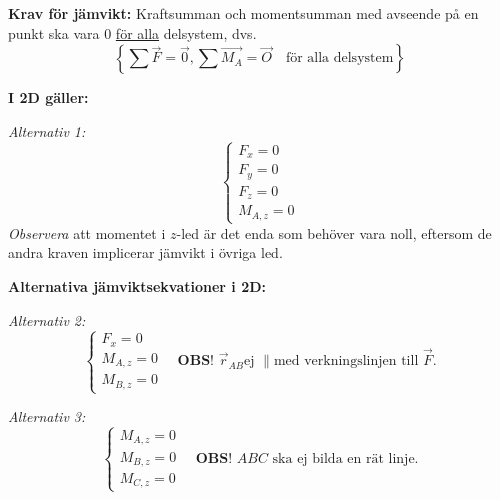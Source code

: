 \documentclass{article}
\newenvironment{ankiflashcard}[1]{}{}
\begin{document}
\begin{paracol}{2}
\begin{ankiflashcard}{Formulera kraven för jämvikt (statik).}
    
\textbf{Krav för jämvikt:} Kraftsumman och momentsumman med avseende på en punkt ska vara $0$ \underline{för alla} delsystem, dvs.
$$
\left\lbrace \sum \vec F = \vec 0, \sum \vec {M_A} = \vec O \quad \text{för alla delsystem}\right\rbrace
$$
\end{ankiflashcard}

\textbf{I 2D gäller:}

\begin{ankiflashcard}{Ställ upp den generella jämviktsekvationen i 2D.}
    
\textit{Alternativ 1:}
$$
\begin{cases}
    F_x = 0\\
    F_y = 0\\
    F_z = 0\\
    M_{A,z} = 0
\end{cases}
$$
\textit{Observera} att momentet i $z$-led är det enda som behöver vara noll, eftersom de andra kraven implicerar jämvikt i övriga led.
\end{ankiflashcard}

\begin{ankiflashcard}{Formulera de alternativa jämviktsekvationerna i 2D.}
    
\textbf{Alternativa jämviktsekvationer i 2D:}

\textit{Alternativ 2:}
$$
\begin{cases}
F_x = 0 \\
M_{A,z} = 0 \\
M_{B,z} = 0
\end{cases} \quad \textbf{OBS! } \vec r_{AB} \text{ej } \parallel \text{med verkningslinjen till } \vec F.
$$

\textit{Alternativ 3:}
$$
\begin{cases}
    M_{A,z} = 0\\
    M_{B,z} = 0 \\
    M_{C,z} = 0
\end{cases} \quad\textbf{OBS! } ABC \text{ ska ej bilda en rät linje.}
$$

\end{ankiflashcard}

\begin{ankiflashcard}{Vad är ett statiskt obestämt problem?}
    

\end{ankiflashcard}
\end{paracol}
\end{document}
